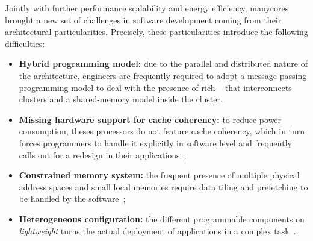     Jointly with further performance scalability and energy efficiency, manycores brought a new set of challenges in software development coming from their architectural particularities.
    Precisely, these particularities introduce the following difficulties:
    \begin{itemize}
        \item \textbf{Hybrid programming model:} due to the parallel and distributed nature of the architecture, engineers are frequently required to adopt a message-passing programming model to deal with the presence of rich \nocs~\cite{kelly2013} that interconnects clusters and a shared-memory model inside the cluster.
        \item \textbf{Missing hardware support for cache coherency:} to reduce power consumption, theses processors do not feature cache coherency, which in turn forces programmers to handle it explicitly in software level and frequently calls out for a redesign in their applications~\cite{francesquini2015};
        \item \textbf{Constrained memory system:} the frequent presence of multiple physical address spaces and small local memories require data tiling and prefetching to be handled by the software~\cite{Castro2016};
        \item \textbf{Heterogeneous configuration:} the different programmable components on \textit{lightweight} \manycores turns the actual deployment of applications in a complex task~\cite{barbalace2015}.
    \end{itemize}




